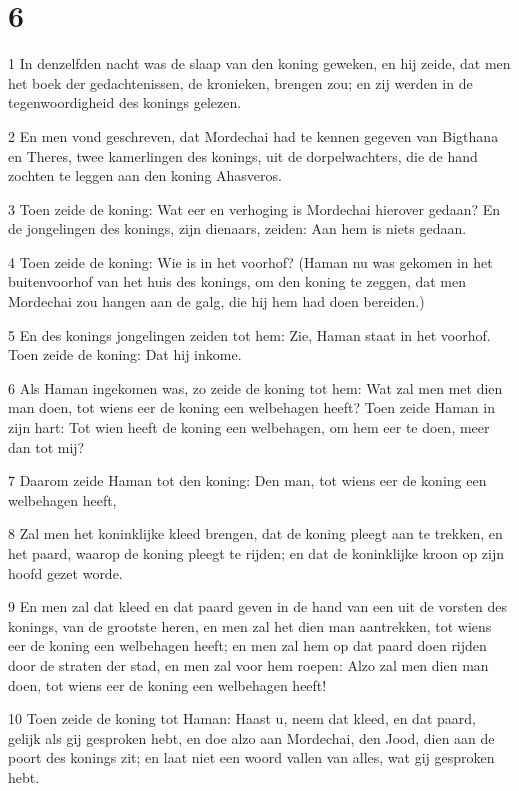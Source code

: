 \chapter{6}

\par 1 In denzelfden nacht was de slaap van den koning geweken, en hij zeide, dat men het boek der gedachtenissen, de kronieken, brengen zou; en zij werden in de tegenwoordigheid des konings gelezen.
\par 2 En men vond geschreven, dat Mordechai had te kennen gegeven van Bigthana en Theres, twee kamerlingen des konings, uit de dorpelwachters, die de hand zochten te leggen aan den koning Ahasveros.
\par 3 Toen zeide de koning: Wat eer en verhoging is Mordechai hierover gedaan? En de jongelingen des konings, zijn dienaars, zeiden: Aan hem is niets gedaan.
\par 4 Toen zeide de koning: Wie is in het voorhof? (Haman nu was gekomen in het buitenvoorhof van het huis des konings, om den koning te zeggen, dat men Mordechai zou hangen aan de galg, die hij hem had doen bereiden.)
\par 5 En des konings jongelingen zeiden tot hem: Zie, Haman staat in het voorhof. Toen zeide de koning: Dat hij inkome.
\par 6 Als Haman ingekomen was, zo zeide de koning tot hem: Wat zal men met dien man doen, tot wiens eer de koning een welbehagen heeft? Toen zeide Haman in zijn hart: Tot wien heeft de koning een welbehagen, om hem eer te doen, meer dan tot mij?
\par 7 Daarom zeide Haman tot den koning: Den man, tot wiens eer de koning een welbehagen heeft,
\par 8 Zal men het koninklijke kleed brengen, dat de koning pleegt aan te trekken, en het paard, waarop de koning pleegt te rijden; en dat de koninklijke kroon op zijn hoofd gezet worde.
\par 9 En men zal dat kleed en dat paard geven in de hand van een uit de vorsten des konings, van de grootste heren, en men zal het dien man aantrekken, tot wiens eer de koning een welbehagen heeft; en men zal hem op dat paard doen rijden door de straten der stad, en men zal voor hem roepen: Alzo zal men dien man doen, tot wiens eer de koning een welbehagen heeft!
\par 10 Toen zeide de koning tot Haman: Haast u, neem dat kleed, en dat paard, gelijk als gij gesproken hebt, en doe alzo aan Mordechai, den Jood, dien aan de poort des konings zit; en laat niet een woord vallen van alles, wat gij gesproken hebt.
